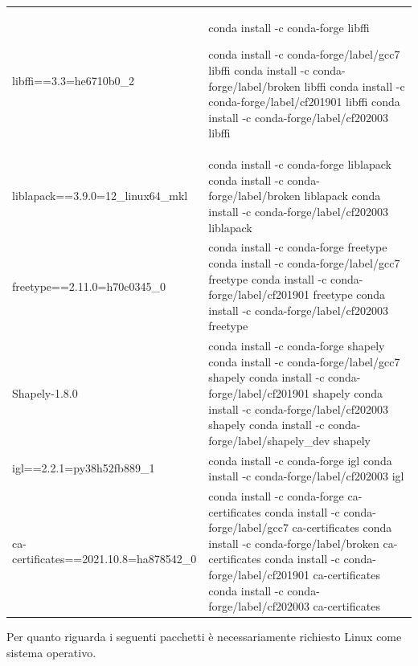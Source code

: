 \begin{table}
\begin{tabular}{ |p{8cm}||p{8cm}|  }
libffi==3.3=he6710b0\_2&conda install -c conda-forge libffi 

conda install -c conda-forge/label/gcc7 libffi 
conda install -c conda-forge/label/broken libffi 
conda install -c conda-forge/label/cf201901 libffi 
conda install -c conda-forge/label/cf202003 libffi\\

  liblapack==3.9.0=12\_linux64\_mkl&	conda install -c conda-forge liblapack  	conda install -c conda-forge/label/broken liblapack 	conda install -c conda-forge/label/cf202003 liblapack\\


  freetype==2.11.0=h70c0345\_0&	conda install -c conda-forge freetype  	conda install -c conda-forge/label/gcc7 freetype 	conda install -c conda-forge/label/cf201901 freetype 	conda install -c conda-forge/label/cf202003 freetype\\


  Shapely-1.8.0&	conda install -c conda-forge shapely 	conda install -c conda-forge/label/gcc7 shapely 	conda install -c conda-forge/label/cf201901 shapely 	conda install -c conda-forge/label/cf202003 shapely 	conda install -c conda-forge/label/shapely\_dev shapely\\




  igl==2.2.1=py38h52fb889\_1&	conda install -c conda-forge igl  	conda install -c conda-forge/label/cf202003 igl\\


  ca-certificates==2021.10.8=ha878542\_0&	conda install -c conda-forge ca-certificates  	conda install -c conda-forge/label/gcc7 ca-certificates  	conda install -c conda-forge/label/broken ca-certificates  	conda install -c conda-forge/label/cf201901 ca-certificates 	conda install -c conda-forge/label/cf202003 ca-certificates\\



\end{tabular}
\end{table}

\newpage

Per quanto riguarda i seguenti pacchetti è necessariamente richiesto Linux come sistema operativo.

